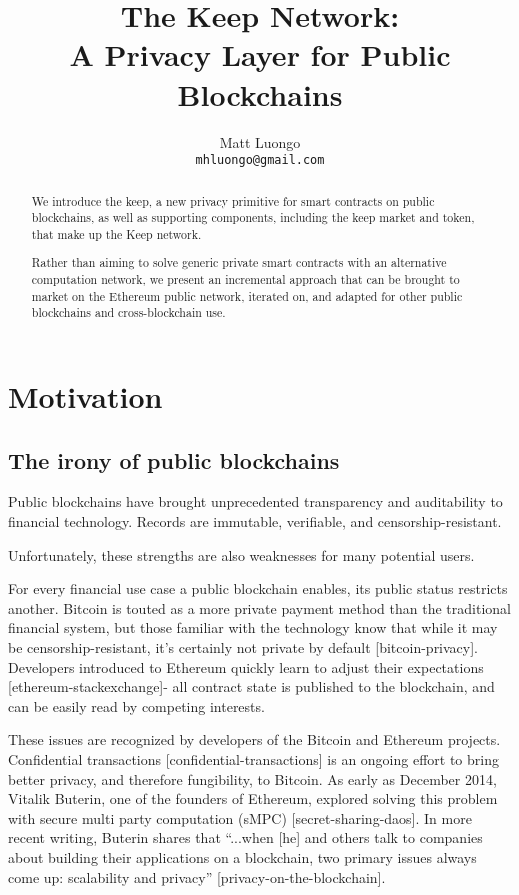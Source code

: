 \documentclass[11pt]{article}
\title{The Keep Network:\protect\\A Privacy Layer for Public Blockchains}
\author{Matt Luongo \\
  {\tt mhluongo@gmail.com}}
\date{}
\begin{document}
\maketitle
\begin{abstract}
  We introduce the keep, a new privacy primitive for smart contracts
  on public blockchains, as well as supporting components, including
  the keep market and token, that make up the Keep network.

  Rather than aiming to solve generic private smart contracts with an
  alternative computation network, we present an incremental approach
  that can be brought to market on the Ethereum public network,
  iterated on, and adapted for other public blockchains and
  cross-blockchain use.
\end{abstract}

\section{Motivation}

\subsection{The irony of public blockchains}

Public blockchains have brought unprecedented transparency and
auditability to financial technology. Records are immutable,
verifiable, and censorship-resistant.

Unfortunately, these strengths are also weaknesses for many potential
users.

For every financial use case a public blockchain enables, its public
status restricts another. Bitcoin is touted as a more private payment
method than the traditional financial system, but those familiar with
the technology know that while it may be censorship-resistant, it’s
certainly not private by default [bitcoin-privacy]. Developers
introduced to Ethereum quickly learn to adjust their expectations
[ethereum-stackexchange]- all contract state is published to the
blockchain, and can be easily read by competing interests.

These issues are recognized by developers of the Bitcoin and Ethereum
projects. Confidential transactions [confidential-transactions] is an
ongoing effort to bring better privacy, and therefore fungibility, to
Bitcoin. As early as December 2014, Vitalik Buterin, one of the
founders of Ethereum, explored solving this problem with secure multi
party computation (sMPC) [secret-sharing-daos]. In more recent
writing, Buterin shares that “...when [he] and others talk to
companies about building their applications on a blockchain, two
primary issues always come up: scalability and privacy”
[privacy-on-the-blockchain].
\end{document}
